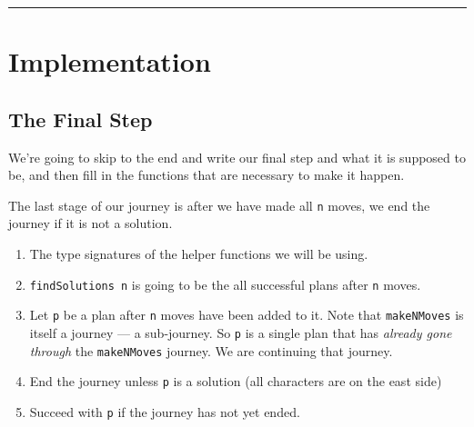 \documentclass[]{article}
\newenvironment{Shaded}{}{}
\newcommand{\KeywordTok}[1]{\textcolor[rgb]{0.00,0.44,0.13}{\textbf{{#1}}}}
\newcommand{\DataTypeTok}[1]{\textcolor[rgb]{0.56,0.13,0.00}{{#1}}}
\newcommand{\CommentTok}[1]{\textcolor[rgb]{0.38,0.63,0.69}{\textit{{#1}}}}
\newcommand{\OtherTok}[1]{\textcolor[rgb]{0.00,0.44,0.13}{{#1}}}
\newcommand{\FunctionTok}[1]{\textcolor[rgb]{0.02,0.16,0.49}{{#1}}}
\newcommand{\NormalTok}[1]{{#1}}
\begin{document}
\begin{center}\rule{0.5\linewidth}{\linethickness}\end{center}

\section{Implementation}\label{implementation}

\subsection{The Final Step}\label{the-final-step}

We're going to skip to the end and write our final step and what it is supposed
to be, and then fill in the functions that are necessary to make it happen.

The last stage of our journey is after we have made all \texttt{n} moves, we end
the journey if it is not a solution.

\begin{Shaded}
\end{Shaded}

\begin{enumerate}
\def\labelenumi{\arabic{enumi}.}
\tightlist
\item
  The type signatures of the helper functions we will be using.
\item
  \texttt{findSolutions\ n} is going to be the all successful plans after
  \texttt{n} moves.
\item
  Let \texttt{p} be a plan after \texttt{n} moves have been added to it. Note
  that \texttt{makeNMoves} is itself a journey --- a sub-journey. So \texttt{p}
  is a single plan that has \emph{already gone through} the \texttt{makeNMoves}
  journey. We are continuing that journey.
\item
  End the journey unless \texttt{p} is a solution (all characters are on the
  east side)
\item
  Succeed with \texttt{p} if the journey has not yet ended.
\end{enumerate}
\end{document}
